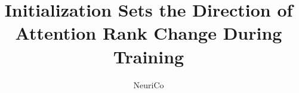 \documentclass{article}
\title{Initialization Sets the Direction of Attention Rank Change During Training}
\author{NeuriCo}
\begin{document}
\maketitle

\begin{abstract}

\end{abstract}










\appendix

\end{document}
